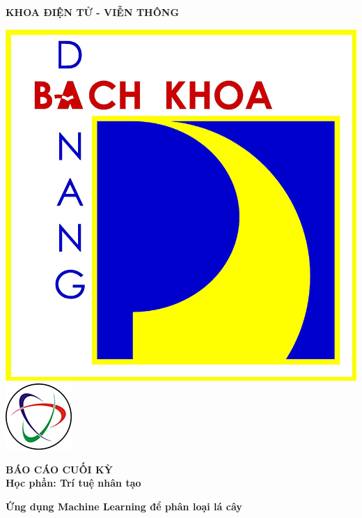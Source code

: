 \documentclass[a4paper]{article}
\begin{document}
\begin{titlepage}
\begin{center}
    \vspace{7pt}
    \textbf{KHOA ĐIỆN TỬ - VIỄN THÔNG}
\end{center}
\vspace{10pt}
\begin{center}
    \includegraphics[scale=0.37]{images/logodut.jpg}
    \includegraphics[scale=0.75]{images/logoete.jpg}
    
    \vspace{20pt}
    \fontsize{20pt}{17pt}\selectfont 
    \textbf{BÁO CÁO CUỐI KỲ} \\
    \vspace{7pt}
    \textbf{Học phần: Trí tuệ nhân tạo}
    \vspace{7pt}
\end{center}
\begin{flushleft}
    \fontsize{15pt}{10pt}\selectfont  
    \textbf{\textsl{}}
\end{flushleft} 
\begin{center}
    \fontsize{16pt}{17pt}\selectfont 
    \textbf{\textrm{Ứng dụng Machine Learning để phân loại lá cây}}
\end{center}


\end{titlepage}
\end{document}
